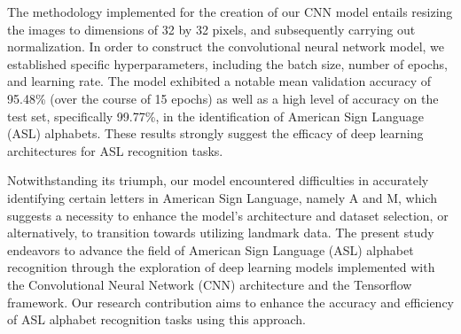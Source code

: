 \documentclass[conference]{IEEEtran}
\begin{document}
The methodology implemented for the creation of our CNN model entails resizing the images to dimensions of 32 by 32 pixels, and subsequently carrying out normalization. In order to construct the convolutional neural network model, we established specific hyperparameters, including the batch size, number of epochs, and learning rate. The model exhibited a notable mean validation accuracy of 95.48\% (over the course of 15 epochs) as well as a high level of accuracy on the test set, specifically 99.77\%, in the identification of American Sign Language (ASL) alphabets. These results strongly suggest the efficacy of deep learning architectures for ASL recognition tasks.

Notwithstanding its triumph, our model encountered difficulties in accurately identifying certain letters in American Sign Language, namely A and M, which suggests a necessity to enhance the model's architecture and dataset selection, or alternatively, to transition towards utilizing landmark data. The present study endeavors to advance the field of American Sign Language (ASL) alphabet recognition through the exploration of deep learning models implemented with the Convolutional Neural Network (CNN) architecture and the Tensorflow framework. Our research contribution aims to enhance the accuracy and efficiency of ASL alphabet recognition tasks using this approach.





\cite{*}
\end{document}

